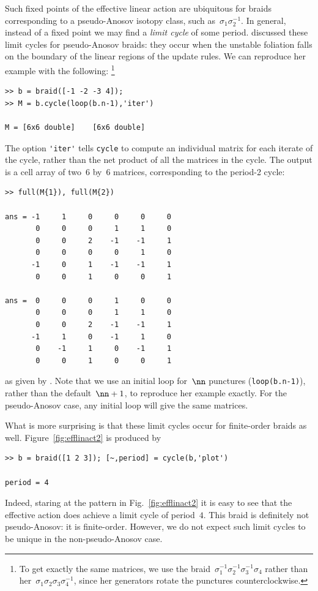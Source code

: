 \documentclass[12pt]{article}
\begin{document}
%
Such fixed points of the effective linear action are ubiquitous for braids
corresponding to a pseudo-Anosov isotopy class, such
as~$\sigma_1\sigma_2^{-1}$. %
In general, instead of a fixed point we may find a \emph{limit cycle} of some
period.  \citet{Yurttas2014_preprint} discussed these limit cycles for
pseudo-Anosov braids: they occur when the unstable foliation falls on the
boundary of the linear regions of the update rules.  We can reproduce her
example with the following:%
\footnote{To get exactly the same matrices, we use the
  braid~$\sigma_1^{-1}\sigma_2^{-1}\sigma_3^{-1}\sigma_4$ rather than
  her~$\sigma_1\sigma_2\sigma_3\sigma_4^{-1}$, since her generators rotate the
  punctures counterclockwise.}
%
\begin{lstlisting}[frame=single,framerule=0pt]
>> b = braid([-1 -2 -3 4]);
>> M = b.cycle(loop(b.n-1),'iter')

M = [6x6 double]    [6x6 double]
\end{lstlisting}
The option \lstinline{'iter'} tells \lstinline{cycle} to compute an individual
matrix for each iterate of the cycle, rather than the net product of all the
matrices in the cycle.  The output is a cell array of two~$6$ by~$6$ matrices,
corresponding to the period-2 cycle:
\begin{lstlisting}[frame=single,framerule=0pt]
>> full(M{1}), full(M{2})

ans = -1     1     0     0     0     0
       0     0     0     1     1     0
       0     0     2    -1    -1     1
       0     0     0     0     1     0
      -1     0     1    -1    -1     1
       0     0     1     0     0     1

ans =  0     0     0     1     0     0
       0     0     0     1     1     0
       0     0     2    -1    -1     1
      -1     1     0    -1     1     0
       0    -1     1     0    -1     1
       0     0     1     0     0     1
\end{lstlisting}
as given by \citet{Yurttas2014_preprint}.  Note that we use an initial loop
for~$\nn$ punctures (\lstinline{loop(b.n-1)}), rather than the
default~$\nn+1$, to reproduce her example exactly.  For the pseudo-Anosov
case, any initial loop will give the same matrices.

What is more surprising is that these limit cycles occur for finite-order
braids as well.  Figure~\ref{fig:efflinact2} is produced by
\begin{lstlisting}[frame=single,framerule=0pt]
>> b = braid([1 2 3]); [~,period] = cycle(b,'plot')

period = 4
\end{lstlisting}
Indeed, staring at the pattern in Fig.~\ref{fig:efflinact2} it is easy to see
that the effective action does achieve a limit cycle of period~$4$.  This
braid is definitely not pseudo-Anosov: it is finite-order.
%
However, we do not expect such limit cycles to be unique in the
non-pseudo-Anosov case.
\end{document}
